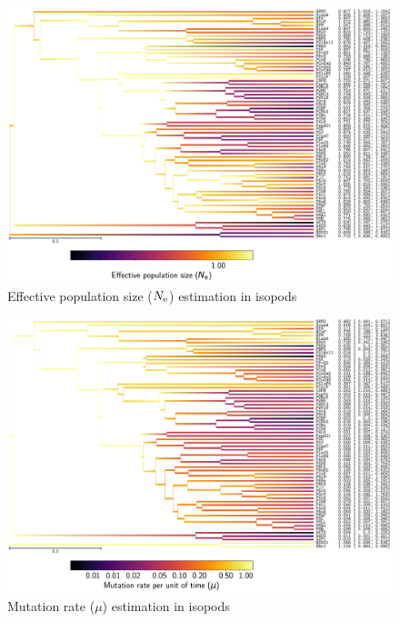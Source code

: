 \documentclass{article}
\begin{document}
	\begin{figure}[H]
		\centering
		\includegraphics[width=\linewidth, page=1]{isopods/12CDS_SiteMutSelBranchNe_R1_LogPopulationSize}
		\caption[$\Ne$ estimation in isopods]{Effective population size ($\Ne$) estimation in isopods}
	\end{figure}

	\begin{figure}[H]
		\centering
		\includegraphics[width=\linewidth, page=1]{isopods/12CDS_SiteMutSelBranchNe_R1_LogMutationRatePerTime}
		\caption[Mutation rate estimation in isopods]{Mutation rate ($\mu$) estimation in isopods}
	\end{figure}
\end{document}
